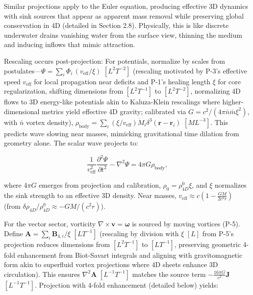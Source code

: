 Similar projections apply to the Euler equation, producing effective 3D dynamics with sink sources that appear as apparent mass removal while preserving global conservation in 4D (detailed in Section 2.8). Physically, this is like discrete underwater drains vanishing water from the surface view, thinning the medium and inducing inflows that mimic attraction.

Rescaling occurs post-projection: For potentials, normalize by scales from postulates---$\Psi = \sum_i \Phi_i \, (v_{\text{eff}} / \xi)$ $[L^2 T^{-2}]$ (rescaling motivated by P-3's effective speed $v_{\text{eff}}$ for local propagation near deficits and P-1's healing length $\xi$ for core regularization, shifting dimensions from $[L^2 T^{-1}]$ to $[L^2 T^{-2}]$, normalizing 4D flows to 3D energy-like potentials akin to Kaluza-Klein rescalings where higher-dimensional metrics yield effective 4D gravity; calibrated via $G = c^2 / (4\pi \bar{n} \bar{m} \xi^2)$, with $\bar{n}$ vortex density), $\rho_{\text{body}} = \sum_i \left( \xi / v_{\text{eff}} \right) \dot{M}_i \delta^3(\mathbf{r} - \mathbf{r}_i)$ $[M L^{-3}]$. This predicts wave slowing near masses, mimicking gravitational time dilation from geometry alone. The scalar wave projects to:

\begin{equation}
\frac{1}{v_{\text{eff}}^2} \frac{\partial^2 \Psi}{\partial t^2} - \nabla^2 \Psi = 4\pi G \rho_{\text{body}},
\end{equation}

where $4\pi G$ emerges from projection and calibration, $\rho_0 = \rho_{4D}^0 \xi$, and $\xi$ normalizes the sink strength to an effective 3D density. Near masses, $v_{\text{eff}} \approx c \left(1 - \frac{G M}{2 c^2 r}\right)$ (from $\delta \rho_{4D} / \rho_{4D}^0 \approx - G M / (c^2 r)$).

For the vector sector, vorticity $\nabla \times \mathbf{v} = \boldsymbol{\omega}$ is sourced by moving vortices (P-5). Define $\mathbf{A} = \sum_i \mathbf{B}_{4,i} / \xi$ $[L T^{-1}]$ (rescaling by division with $\xi$ $[L]$ from P-5's projection reduces dimensions from $[L^2 T^{-1}]$ to $[L T^{-1}]$, preserving geometric 4-fold enhancement from Biot-Savart integrals and aligning with gravitomagnetic form akin to superfluid vortex projections where 4D sheets enhance 3D circulation). This ensures $\nabla^2 \mathbf{A}$ $[L^{-1} T^{-1}]$ matches the source term $-\frac{16\pi G}{c^2} \mathbf{J}$ $[L^{-1} T^{-1}]$. Projection with 4-fold enhancement (detailed below) yields:

